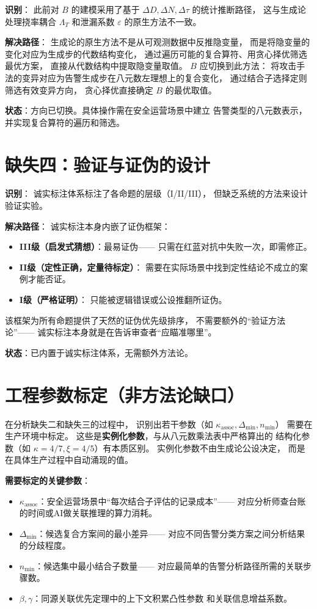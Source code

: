 \documentclass[11pt,a4paper]{article}
\begin{document}
\textbf{识别}：
此前对 $B$ 的建模采用了基于 $\Delta D, \Delta N, \Delta \tau$ 的统计推断路径，
这与生成论处理挠率耦合 $\Lambda_T$ 和泄漏系数 $\varepsilon$ 的原生方法不一致。

\textbf{解决路径}：
生成论的原生方法不是从可观测数据中反推隐变量，
而是将隐变量的变化对应为生成步的代数结构变化，
通过遍历可能的复合算符、用贪心择优筛选最优方案，
直接从代数结构中提取隐变量取值。
$B$ 应切换到此方法：
将攻击手法的变异对应为告警生成步在八元数左理想上的复合变化，
通过结合子选择定则筛选有效变异方向，
贪心择优直接确定 $B$ 的最优取值。

\textbf{状态}：方向已切换。具体操作需在安全运营场景中建立
告警类型的八元数表示，并实现复合算符的遍历和筛选。

\section{缺失四：验证与证伪的设计}

\textbf{识别}：
诚实标注体系标注了各命题的层级（I/II/III），
但缺乏系统的方法来设计验证实验。

\textbf{解决路径}：
诚实标注本身内嵌了证伪框架：
\begin{itemize}
    \item \textbf{III级（启发式猜想）}：最易证伪——
          只需在红蓝对抗中失败一次，即需修正。
    \item \textbf{II级（定性正确，定量待标定）}：
          需要在实际场景中找到定性结论不成立的案例才能否证。
    \item \textbf{I级（严格证明）}：
          只能被逻辑错误或公设推翻所证伪。
\end{itemize}
该框架为所有命题提供了天然的证伪优先级排序，
不需要额外的“验证方法论”——
诚实标注本身就是在告诉审查者“应瞄准哪里”。

\textbf{状态}：已内置于诚实标注体系，无需额外方法论。

\section{工程参数标定（非方法论缺口）}

在分析缺失二和缺失三的过程中，
识别出若干参数（如 $\kappa_{\text{assoc}}, \Delta_{\min}, n_{\min}$）
需要在生产环境中标定。
这些是\textbf{实例化参数}，与从八元数乘法表中严格算出的
结构化参数（如 $\kappa = 4/7, \xi = 4/5$）有本质区别。
实例化参数不由生成论公设决定，
而是在具体生产过程中自动涌现的值。

\textbf{需要标定的关键参数}：
\begin{itemize}
    \item $\kappa_{\text{assoc}}$：安全运营场景中“每次结合子评估的记录成本”——
          对应分析师查台账的时间或AI做关联推理的算力消耗。
    \item $\Delta_{\min}$：候选复合方案间的最小差异——
          对应不同告警分类方案之间分析结果的分歧程度。
    \item $n_{\min}$：候选集中最小结合子数量——
          对应最简单的告警分析路径所需的关联步骤数。
    \item $\beta, \gamma$：同源关联优先定理中的上下文积累凸性参数
          和关联信息增益系数。
\end{itemize}
\end{document}
